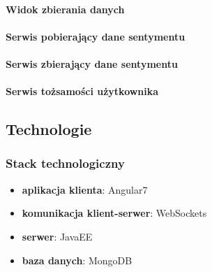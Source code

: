 \paragraph*{Widok zbierania danych}
\paragraph*{Serwis pobierający dane sentymentu}
\paragraph*{Serwis zbierający dane sentymentu}
\paragraph*{Serwis tożsamości użytkownika}

\subsection{Technologie}
\subsubsection{Stack technologiczny}
\begin{itemize}
  \item {\textbf{aplikacja klienta}: Angular7}
  \item {\textbf{komunikacja klient-serwer}: WebSockets}
  \item {\textbf{serwer}: JavaEE}
  \item {\textbf{baza danych}: MongoDB}
\end{itemize}
\clearpage
